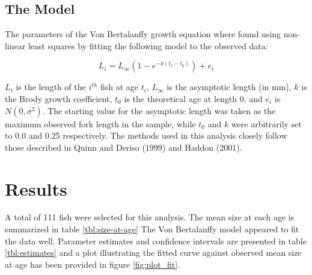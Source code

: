 \documentclass{article}
\begin{document}
\subsection*{The Model}
\label{sub:the_model}

The parameters of the Von Bertalanffy growth equation where found using
non-linear least squares by fitting the following model to the
observed data:

\begin{equation}
L_i = L_{\infty} (1 - e^{-k(t_i-t_0)}) + e_i
\end{equation}

$L_i$ is the length of the $i^{th}$ fish at age $t_i$, $L_{\infty}$ is the
asymptotic length (in mm), $k$ is the Brody growth coefficient, $t_0$
is the theoretical age at length 0, and $e_i$  is $N(0,\sigma ^2)$.
The starting value for the asymptotic length was taken as the maximum
observed fork length in the sample, while $t_0$ and $k$ were arbitrarily
set to 0.0 and 0.25 respectively.  The methods used in this analysis
closely follow those described in Quinn and Deriso (1999) and Haddon
(2001).

\section*{Results}
\label{sec:results}

A total of 111 fish were selected for this analysis.
The mean size at each age is summarized in table \ref{tbl:size-at-age}
The Von Bertalanffy model appeared to fit the data well.  Parameter
estimates and confidence intervals are presented in table
\ref{tbl:estimates} and a plot illustrating the fitted curve against
observed mean size at age has been provided in figure \ref{fig:plot_fit}.
\end{document}
